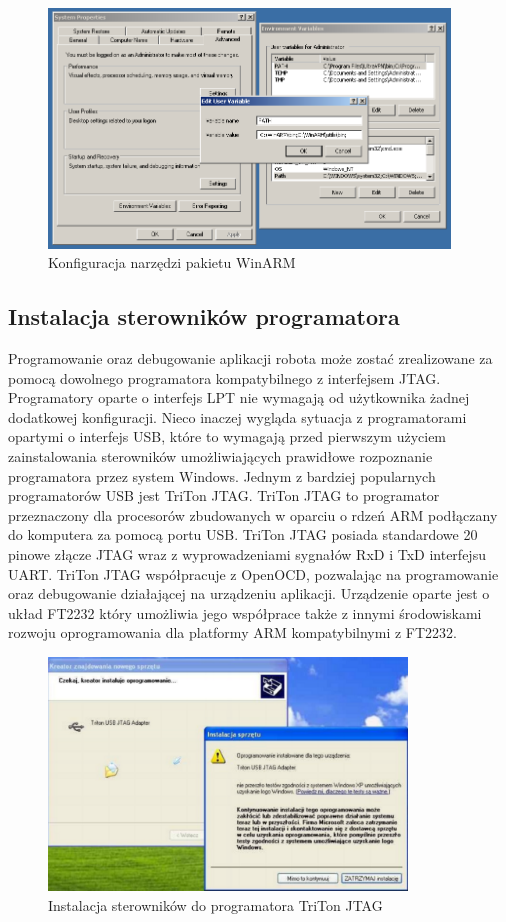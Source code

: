 \begin{figure}[h!]
 \centering
 \includegraphics[width=0.95\textwidth]{../images/ch03/winarm-config-win32.png}
 \caption{Konfiguracja narzędzi pakietu WinARM}
 \label{fig:winarm-config}
\end{figure}

\subsection{Instalacja sterowników programatora}
Programowanie oraz debugowanie aplikacji robota może zostać zrealizowane za
pomocą dowolnego programatora kompatybilnego z interfejsem JTAG. Programatory
oparte o interfejs LPT nie wymagają od użytkownika żadnej dodatkowej
konfiguracji. Nieco inaczej wygląda sytuacja z programatorami opartymi o
interfejs USB, które to wymagają przed pierwszym użyciem zainstalowania
sterowników umożliwiających prawidłowe rozpoznanie programatora przez system
Windows. Jednym z bardziej popularnych programatorów USB jest TriTon JTAG. TriTon
JTAG to programator przeznaczony dla procesorów zbudowanych w oparciu o rdzeń ARM
podłączany do komputera za pomocą portu USB. TriTon JTAG posiada standardowe 20
pinowe złącze JTAG wraz z wyprowadzeniami sygnałów RxD i TxD interfejsu UART.
TriTon JTAG współpracuje z OpenOCD, pozwalając na programowanie oraz debugowanie
działającej na urządzeniu aplikacji. Urządzenie oparte jest o układ FT2232 który
umożliwia jego współprace także z innymi środowiskami rozwoju oprogramowania dla
platformy ARM kompatybilnymi z FT2232.

\begin{figure}[h!]
 \centering
 \includegraphics[width=0.85\textwidth]{../images/ch03/jtag-install-s2.png}
 \caption{Instalacja sterowników do programatora TriTon JTAG}
 \label{fig:TritonInstall}
\end{figure}

